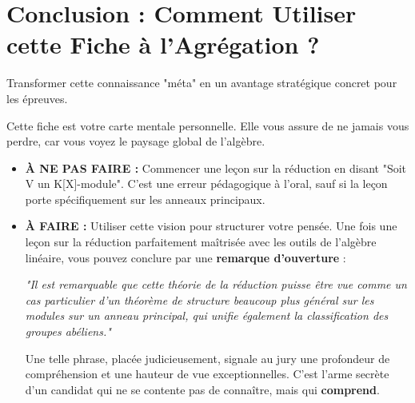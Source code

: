 \section{Conclusion : Comment Utiliser cette Fiche à l'Agrégation ?}

\begin{objectif}
    Transformer cette connaissance "méta" en un avantage stratégique concret pour les épreuves.
\end{objectif}

\begin{remark}
    Cette fiche est votre carte mentale personnelle. Elle vous assure de ne jamais vous perdre, car vous voyez le paysage global de l'algèbre.
    \begin{itemize}
        \item \textbf{À NE PAS FAIRE :} Commencer une leçon sur la réduction en disant "Soit V un K[X]-module". C'est une erreur pédagogique à l'oral, sauf si la leçon porte spécifiquement sur les anneaux principaux.
        \item \textbf{À FAIRE :} Utiliser cette vision pour structurer votre pensée. Une fois une leçon sur la réduction parfaitement maîtrisée avec les outils de l'algèbre linéaire, vous pouvez conclure par une \textbf{remarque d'ouverture} :
        
        \textit{"Il est remarquable que cette théorie de la réduction puisse être vue comme un cas particulier d'un théorème de structure beaucoup plus général sur les modules sur un anneau principal, qui unifie également la classification des groupes abéliens."}
        
        Une telle phrase, placée judicieusement, signale au jury une profondeur de compréhension et une hauteur de vue exceptionnelles. C'est l'arme secrète d'un candidat qui ne se contente pas de connaître, mais qui \textbf{comprend}.
    \end{itemize}
\end{remark}